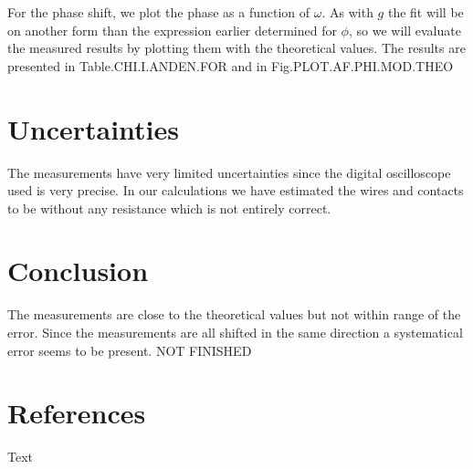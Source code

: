 \documentclass[../main/main.tex]{subfiles}
\begin{document}
For the phase shift, we plot the phase as a function of \( \omega \).
As with \( g \) the fit will be on another form than the expression earlier determined for \( \phi \), so we will evaluate the measured results by plotting them with the theoretical values.
The results are presented in Table.CHI.I.ANDEN.FOR and in Fig.PLOT.AF.PHI.MOD.THEO

\section{Uncertainties}

The measurements have very limited uncertainties since the digital oscilloscope used is very precise.
In our calculations we have estimated the wires and contacts to be without any resistance which is not entirely correct.

\section{Conclusion}

The measurements are close to the theoretical values but not within range of the error.
Since the measurements are all shifted in the same direction a systematical error seems to be present.
NOT FINISHED

\section{References}

Text
\end{document}
